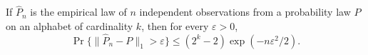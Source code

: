 If \(\widehat P_n\) is the empirical law of \(n\) independent observations from a probability law \(P\) on an alphabet of cardinality \(k\), then for every \(\varepsilon>0\),
\[
 \Pr\{\|\widehat P_n-P\|_1>\varepsilon\}
 \le (2^k-2)\exp(-n\varepsilon^2/2).
\]